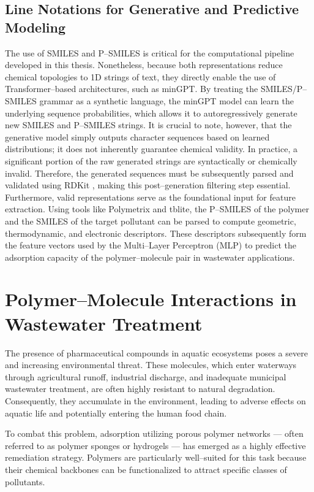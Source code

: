 \subsection*{Line Notations for Generative and Predictive Modeling}
The use of SMILES and P--SMILES is critical for the computational pipeline developed in this thesis. Nonetheless, because both representations reduce chemical topologies to 1D strings of text, they directly enable the use of Transformer--based architectures, such as minGPT. By treating the SMILES/P--SMILES grammar as a synthetic language, the minGPT model can learn the underlying sequence probabilities, which allows it to autoregressively generate new SMILES and P--SMILES strings. It is crucial to note, however, that the generative model simply outputs character sequences based on learned distributions; it does not inherently guarantee chemical validity. In practice, a significant portion of the raw generated strings are syntactically or chemically invalid. Therefore, the generated sequences must be subsequently parsed and validated using RDKit \cite{rdkit}, making this post--generation filtering step essential.
Furthermore, valid representations serve as the foundational input for feature extraction. Using tools like Polymetrix and tblite, the P--SMILES of the polymer and the SMILES of the target pollutant can be parsed to compute geometric, thermodynamic, and electronic descriptors. These descriptors subsequently form the feature vectors used by the Multi--Layer Perceptron (MLP) to predict the adsorption capacity of the polymer--molecule pair in wastewater applications.


\section{Polymer--Molecule Interactions in Wastewater Treatment}
\label{sec:interactions}

The presence of pharmaceutical compounds in aquatic ecosystems poses a severe and increasing environmental threat. These molecules, which enter waterways through agricultural runoff, industrial discharge, and inadequate municipal wastewater treatment, are often highly resistant to natural degradation. Consequently, they accumulate in the environment, leading to adverse effects on aquatic life and potentially entering the human food chain.

To combat this problem, adsorption utilizing porous polymer networks — often referred to as polymer sponges or hydrogels — has emerged as a highly effective remediation strategy. Polymers are particularly well--suited for this task because their chemical backbones can be functionalized to attract specific classes of pollutants.

